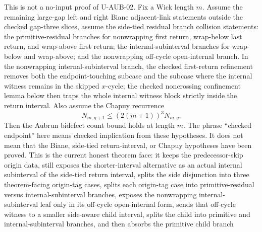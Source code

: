 \begin{theorem}
  \label{thm:large-gap-minimal-frontier-endpoint}
  \leanok
  This is not a no-input proof of U-AUB-02.  Fix a Wick length \(m\).
  Assume the remaining large-gap left and right
  Biane adjacent-link statements outside the checked gap-three slices,
  assume the side-tied residual branch collision statements: the
  primitive-residual branches for nonwrapping first return, wrap-below last
  return, and wrap-above first return; the internal-subinterval branches for
  wrap-below and wrap-above; and the nonwrapping off-cycle open-internal
  branch.
  In the nonwrapping internal-subinterval branch, the checked
  first-return refinement removes both the endpoint-touching subcase and the
  subcase where the internal witness remains in the skipped \(x\)-cycle; the
  checked noncrossing confinement lemma below then traps the whole internal
  witness block strictly inside the return interval.
  Also assume the Chapuy recurrence
  \[
    N_{m,g+1} \le (2(m+1))^3 N_{m,g}.
  \]
  Then the Aubrun bidefect count bound holds at length \(m\).
  The phrase ``checked endpoint'' here means checked implication from these
  hypotheses.  It does not mean that the Biane, side-tied return-interval, or
  Chapuy hypotheses have been proved.  This is the current honest theorem face:
  it keeps the predecessor-skip origin data, still exposes the shorter-interval
  alternative as an actual internal subinterval of the side-tied return
  interval, splits the side disjunction into three theorem-facing origin-tag
  cases, splits each origin-tag case into primitive-residual versus
  internal-subinterval branches, exposes the nonwrapping internal-subinterval
  leaf only in its off-cycle open-internal form, sends that off-cycle witness
  to a smaller side-aware child interval, splits the child into primitive and
  internal-subinterval branches, and then absorbs the primitive child branch

\end{theorem}

